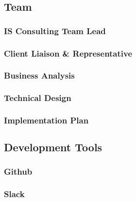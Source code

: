\documentclass[letterpaper,11pt,2p]{elsarticle}
\begin{document}
\subsection{ Team}
\label{subsec1}


\subsubsection{ IS Consulting Team Lead}
\label{subsec1}

\subsubsection{ Client Liaison \& Representative }
\label{subsec1}

\subsubsection{ Business Analysis}
\label{subsec1}

\subsubsection{ Technical Design}
\label{subsec1}

\subsubsection{ Implementation Plan}
\label{subsec1}


\subsection{ Development Tools}
\label{subsec1}


\subsubsection{ Github}
\label{subsec1}


\subsubsection{ Slack}
\label{subsec1}
\end{document}

